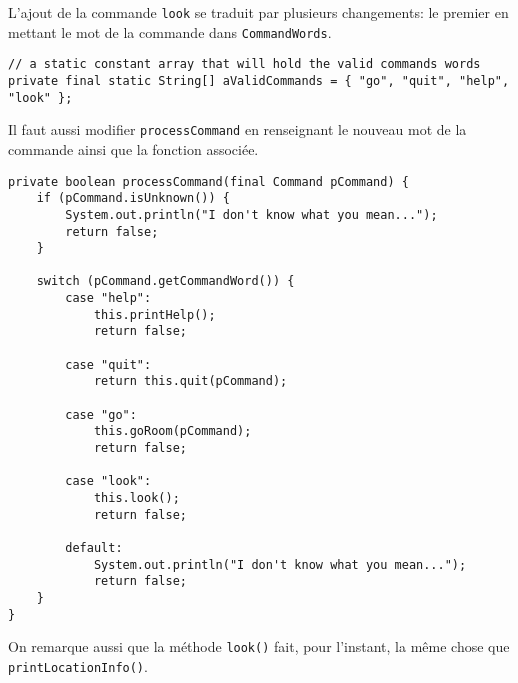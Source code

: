\begin{exercise}[subtitle=look]

L'ajout de la commande \verb|look| se traduit par plusieurs changements: le premier en mettant le mot de la commande dans \verb|CommandWords|.

\begin{verbatim}
// a static constant array that will hold the valid commands words
private final static String[] aValidCommands = { "go", "quit", "help", "look" };
\end{verbatim}

Il faut aussi modifier \verb|processCommand| en renseignant le nouveau mot de la commande ainsi que la fonction associée.

\begin{verbatim}
private boolean processCommand(final Command pCommand) {
    if (pCommand.isUnknown()) {
        System.out.println("I don't know what you mean...");
        return false;
    }

    switch (pCommand.getCommandWord()) {
        case "help":
            this.printHelp();
            return false;

        case "quit":
            return this.quit(pCommand);

        case "go":
            this.goRoom(pCommand);
            return false;

        case "look":
            this.look();
            return false;

        default:
            System.out.println("I don't know what you mean...");
            return false;
    }
}
\end{verbatim}

On remarque aussi que la méthode \verb|look()| fait, pour l'instant, la même chose que \verb|printLocationInfo()|. 
\end{exercise}

